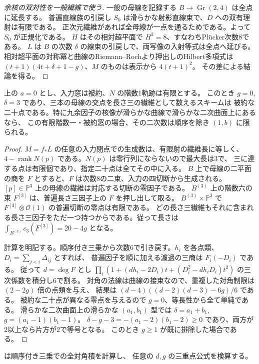 \begin{proof}[余核の双対性を一般繊維で使う]
一般の母線を記録する $B\to\operatorname{Gr}(2,4)$ は全点に延長する。
普遍直線族の引戻し $S_0$ は滑らかな射影直線束で、$D$ への双有理射は有限である。
正次元繊維があれば全母線が一点を通るためである。よって $S_0$ が正規化である。
$H$ はその相対超平面で $H^2=8$、すなわちPlücker次数8である。
$L$ は $B$ の次数 $\delta$ の線束の引戻しで、両写像の入射等式は全点へ延びる。
相対超平面の対称冪と曲線のRiemann--Rochより押出しのHilbert多項式は
$(t+1)(4t+\delta+1-g)$、$M$ のものは表示から $4(t+1)^2$。
その差による結論を得る。
\end{proof}

\begin{corollary}\label{cor:kernel-curve-triple-ruling-genus}
上の $a=0$ とし、入力窓は被約、$N$ の階数1軌跡は有限とする。
このとき $g=0$, $\delta=3$ であり、三本の母線の交点を長さ三の繊維として数えるスキームは
被約な二十点である。特に九余因子の核像が滑らかな曲線で滑らかな二次曲面上にあるなら、
この有限階数一・被約窓の場合、その二次数は順序を除き $(1,b)$ に限られる。
\end{corollary}
\begin{proof}
$M=f_*L$ の任意の入力閉点での生成数は、有限射の繊維長に等しく、
$4-\operatorname{rank}N(p)$ である。$N(p)$ は零行列にならないので最大長は3で、
三に達する点は有限個であり、指定二十点は全てその中に入る。
$B$ 上で母線の二平面の商を $F$ とすると、$F$ は次数8の二束、入力の四切断から生成される。
$[p]\in\mathbb P^3$ 上の母線の繊維は対応する切断の零因子である。
$B^{(3)}$ 上の階数六の束 $F^{[3]}$ は、普遍長さ三因子上の $F$ を押し出して取る。
$B^{(3)}\times\mathbb P^3$ で $F^{[3]}\otimes\mathcal O(1)$ の普遍切断の零点は有限である。
どの長さ三繊維もそれに含まれる長さ三因子をただ一つ持つからである。従って長さは
$\int_{B^{(3)}}c_3(F^{[3]})=20-4g$ となる。

計算を明記する。順序付き三乗から次数6で引き戻す。$h_i$ を各点類、$D_i=\sum_{j<i}\Delta_{ij}$ とすれば、
普遍因子を順に加える濾過の三商は $F_i(-D_i)$ である。
従って $d=\deg F$ とし $\prod_i (1+(dh_i-2D_i)t+(D_i^2-dh_iD_i)t^2)$ の三次係数を積分し6で割る。
対角の法線は曲線の接束なので、重複した対角制限は $(2-2g)$ 倍の点類を与え、
結果は $(d-4)((d-2)(d-3)-6g)/6$ である。
被約な二十点が異なる零点を与えるので $g=0$、等長性から全て単純である。
滑らかな二次曲面上の滑らかな $(a_1,b_1)$ 型では $\delta=a_1+b_1$, $g=(a_1-1)(b_1-1)$。
$\delta-g-3=-(a_1-2)(b_1-2)\ge0$ であり、両方が2以上なら片方が2で等号となる。
このとき $g\ge1$ が既に排除した場合である。
\end{proof}
 は順序付き三乗での全対角積を計算し、
任意の $d,g$ の三重点公式を検算する。
